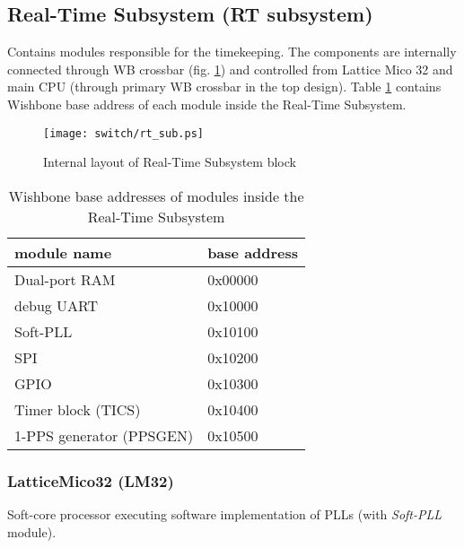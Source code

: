 \subsection{Real-Time Subsystem (RT subsystem)}

Contains modules responsible for the timekeeping. The components are internally connected
through WB crossbar (fig. \ref{fig:rts:hdl}) and controlled from Lattice Mico 32
and main CPU (through primary WB crossbar in the top design). Table
\ref{tab:rts:wb_base} contains Wishbone base address of each module inside the
Real-Time Subsystem.

\begin{figure}[ht]
  \begin{center}
    \texttt{[image: switch/rt\_sub.ps]}
    \caption{Internal layout of Real-Time Subsystem block}
    \label{fig:rts:hdl}
  \end{center}
\end{figure}

\begin{table}[ht]
  \begin{center}
  \begin{tabular}{|l|l|}
    \hline
    module name & base address\\
    \hline \hline
    Dual-port RAM & 0x00000\\
    debug UART & 0x10000\\
    Soft-PLL & 0x10100\\
    SPI & 0x10200\\
    GPIO & 0x10300\\
    Timer block (TICS) & 0x10400\\
    1-PPS generator (PPSGEN) & 0x10500\\
    \hline
  \end{tabular}
  \caption{Wishbone base addresses of modules inside the Real-Time Subsystem}
  \label{tab:rts:wb_base}
  \end{center}
\end{table}

\subsubsection{LatticeMico32 (LM32)}

Soft-core processor executing software implementation of PLLs (with
\emph{Soft-PLL} module).\\


